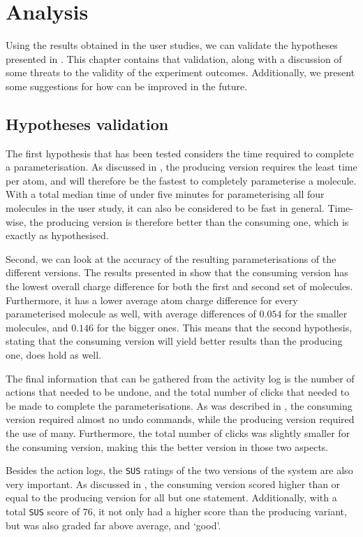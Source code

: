 \chapter{Analysis}

Using the results obtained in the user studies, we can validate the hypotheses presented in . This chapter contains that validation, along with a discussion of some threats to the validity of the experiment outcomes. Additionally, we present some suggestions for how \oframp{} can be improved in the future.



\section{Hypotheses validation}
The first hypothesis that has been tested considers the time required to complete a parameterisation. As discussed in , the producing version requires the least time per atom, and will therefore be the fastest to completely parameterise a molecule. With a total median time of under five minutes for parameterising all four molecules in the user study, it can also be considered to be fast in general. Time-wise, the producing version is therefore better than the consuming one, which is exactly as hypothesised.

Second, we can look at the accuracy of the resulting parameterisations of the different versions. The results presented in  show that the consuming version has the lowest overall charge difference for both the first and second set of molecules. Furthermore, it has a lower average atom charge difference for every parameterised molecule as well, with average differences of $0.054$ for the smaller molecules, and $0.146$ for the bigger ones. This means that the second hypothesis, stating that the consuming version will yield better results than the producing one, does hold as well.

The final information that can be gathered from the activity log is the number of actions that needed to be undone, and the total number of clicks that needed to be made to complete the parameterisations. As was described in , the consuming version required almost no undo commands, while the producing version required the use of many. Furthermore, the total number of clicks was slightly smaller for the consuming version, making this the better version in those two aspects.

Besides the action logs, the \verb|SUS| ratings of the two versions of the system are also very important. As discussed in , the consuming version scored higher than or equal to the producing version for all but one statement. Additionally, with a total \verb|SUS| score of $76$, it not only had a higher score than the producing variant, but was also graded far above average, and `good'.

